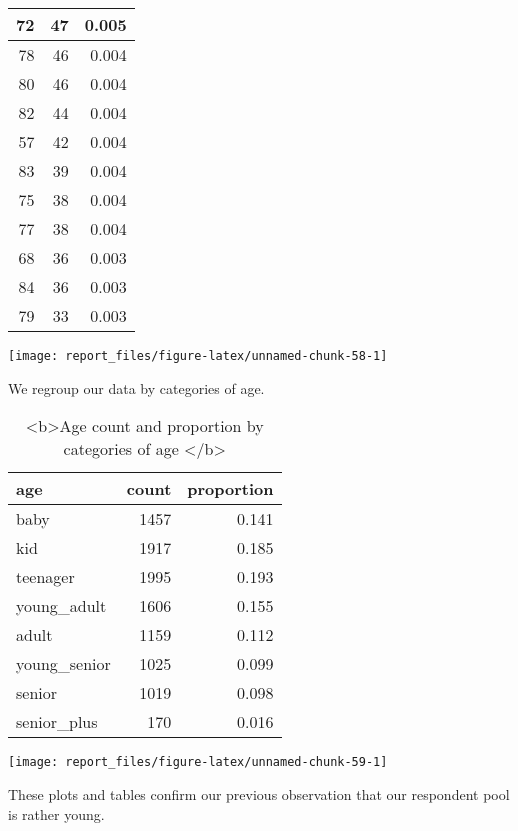 \documentclass[
]{article}
\begin{document}
\begin{table}
\begin{tabular}[t]{r|r|r}
\hline
72 & 47 & 0.005\\
\hline
78 & 46 & 0.004\\
\hline
80 & 46 & 0.004\\
\hline
82 & 44 & 0.004\\
\hline
57 & 42 & 0.004\\
\hline
83 & 39 & 0.004\\
\hline
75 & 38 & 0.004\\
\hline
77 & 38 & 0.004\\
\hline
68 & 36 & 0.003\\
\hline
84 & 36 & 0.003\\
\hline
79 & 33 & 0.003\\
\hline
\end{tabular}
\end{table}

\begin{center}\texttt{[image: report\_files/figure-latex/unnamed-chunk-58-1]} \end{center}

We regroup our data by categories of age.

\begin{table}

\caption{\label{tab:unnamed-chunk-59}<b>Age count and proportion by categories of age </b>}
\centering
\begin{tabular}[t]{l|r|r}
\hline
age & count & proportion\\
\hline
baby & 1457 & 0.141\\
\hline
kid & 1917 & 0.185\\
\hline
teenager & 1995 & 0.193\\
\hline
young\_adult & 1606 & 0.155\\
\hline
adult & 1159 & 0.112\\
\hline
young\_senior & 1025 & 0.099\\
\hline
senior & 1019 & 0.098\\
\hline
senior\_plus & 170 & 0.016\\
\hline
\end{tabular}
\end{table}

\begin{center}\texttt{[image: report\_files/figure-latex/unnamed-chunk-59-1]} \end{center}

These plots and tables confirm our previous observation that our
respondent pool is rather young.
\end{document}

